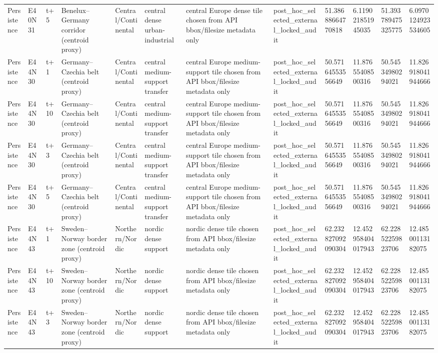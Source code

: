 \begin{landscape}
\begin{longtable}{llllllllllll}
Persistence & E40N31 & t+5 & Benelux–Germany corridor (centroid proxy) & Central/Continental & central dense urban-industrial & central Europe dense tile chosen from API bbox/filesize metadata only & post\_hoc\_selected\_external\_locked\_audit & 51.38688664770818 & 6.119021851945035 & 51.393789475325775 & 6.0970124923534605 \\
Persistence & E44N30 & t+1 & Germany–Czechia belt (centroid proxy) & Central/Continental & central medium-support transfer & central Europe medium-support tile chosen from API bbox/filesize metadata only & post\_hoc\_selected\_external\_locked\_audit & 50.57164553556649 & 11.87655408500316 & 50.54534980294021 & 11.826918041944666 \\
Persistence & E44N30 & t+10 & Germany–Czechia belt (centroid proxy) & Central/Continental & central medium-support transfer & central Europe medium-support tile chosen from API bbox/filesize metadata only & post\_hoc\_selected\_external\_locked\_audit & 50.57164553556649 & 11.87655408500316 & 50.54534980294021 & 11.826918041944666 \\
Persistence & E44N30 & t+3 & Germany–Czechia belt (centroid proxy) & Central/Continental & central medium-support transfer & central Europe medium-support tile chosen from API bbox/filesize metadata only & post\_hoc\_selected\_external\_locked\_audit & 50.57164553556649 & 11.87655408500316 & 50.54534980294021 & 11.826918041944666 \\
Persistence & E44N30 & t+5 & Germany–Czechia belt (centroid proxy) & Central/Continental & central medium-support transfer & central Europe medium-support tile chosen from API bbox/filesize metadata only & post\_hoc\_selected\_external\_locked\_audit & 50.57164553556649 & 11.87655408500316 & 50.54534980294021 & 11.826918041944666 \\
Persistence & E44N43 & t+1 & Sweden–Norway border zone (centroid proxy) & Northern/Nordic & nordic dense support & nordic dense tile chosen from API bbox/filesize metadata only & post\_hoc\_selected\_external\_locked\_audit & 62.232827092090304 & 12.452958404017943 & 62.22852259823706 & 12.48500113182075 \\
Persistence & E44N43 & t+10 & Sweden–Norway border zone (centroid proxy) & Northern/Nordic & nordic dense support & nordic dense tile chosen from API bbox/filesize metadata only & post\_hoc\_selected\_external\_locked\_audit & 62.232827092090304 & 12.452958404017943 & 62.22852259823706 & 12.48500113182075 \\
Persistence & E44N43 & t+3 & Sweden–Norway border zone (centroid proxy) & Northern/Nordic & nordic dense support & nordic dense tile chosen from API bbox/filesize metadata only & post\_hoc\_selected\_external\_locked\_audit & 62.232827092090304 & 12.452958404017943 & 62.22852259823706 & 12.48500113182075 \\

\end{longtable}
\end{landscape}
